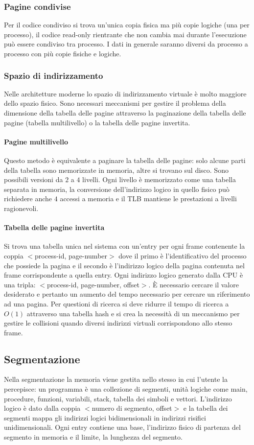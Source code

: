 \subsubsection{Pagine condivise}
Per il codice condiviso si trova un'unica copia fisica ma pi\`u copie logiche (una per processo), il codice read-only rientrante che non cambia mai durante l'esecuzione pu\`o essere
condiviso tra processo. I dati in generale saranno diversi da processo a processo con pi\`u copie fisiche e logiche. 
\subsubsection{Spazio di indirizzamento}
Nelle architetture moderne lo spazio di indirizzamento virtuale \`e molto maggiore dello spazio fisico. Sono necessari meccanismi per gestire il problema della dimensione della
tabella delle pagine attraverso la paginazione della tabella delle pagine (tabella multilivello) o la tabella delle pagine invertita. 
\paragraph{Pagine multilivello}
Questo metodo \`e equivalente a paginare la tabella delle pagine: solo alcune parti della tabella sono memorizzate in memoria, altre si trovano sul disco. Sono possibili versioni da
$2$ a $4$ livelli. Ogni livello \`e memorizzato come una tabella separata in memoria, la conversione dell'indirizzo logico in quello fisico pu\`o richiedere anche $4$ accessi a memoria
e il TLB mantiene le prestazioni a livelli ragionevoli. 
\paragraph{Tabella delle pagine invertita}
Si trova una tabella unica nel sistema con un'entry per ogni frame contenente la coppia $<$process-id, page-number$>$ dove il primo \`e l'identificativo del processo che possiede la
pagina e il secondo \`e l'indirizzo logico della pagina contenuta nel frame corrispondente a quella entry. Ogni indirizzo logico generato dalla CPU \`e una tripla: $<$process-id, 
page-number, offset$>$. \`E necessario cercare il valore desiderato e pertanto un aumento del tempo necessario per cercare un riferimento ad una pagina. Per questioni di ricerca si
deve ridurre il tempo di ricerca a $O(1)$ attraverso una tabella hash e si crea la necessit\`a di un meccanismo per gestire le collisioni quando diversi indirizzi virtuali corrispondono
allo stesso frame. 
\subsection{Segmentazione}
Nella segmentazione la memoria viene gestita nello stesso in cui l'utente la percepisce: un programma \`e una collezione di segmenti, unit\`a logiche come main, procedure, funzioni, 
variabili, stack, tabella dei simboli e vettori. L'indirizzo logico \`e dato dalla coppia $<$numero di segmento, offset$>$ e la tabella dei segmenti mappa gli indirizzi logici 
bidimensionali in indirizzi risifici unidimensionali. Ogni entry contiene una base, l'indirizzo fisico di partenza del segmento in memoria e il limite, la lunghezza del segmento. 
